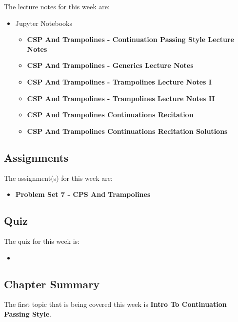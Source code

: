 \noindent The lecture notes for this week are:

\begin{itemize}
    \item Jupyter Notebooks
    \begin{itemize}
        \item \textbf{CSP And Trampolines - Continuation Passing Style Lecture Notes}
        \item \textbf{CSP And Trampolines - Generics Lecture Notes}
        \item \textbf{CSP And Trampolines - Trampolines Lecture Notes I}
        \item \textbf{CSP And Trampolines - Trampolines Lecture Notes II}
        \item \textbf{CSP And Trampolines Continuations Recitation}
        \item \textbf{CSP And Trampolines Continuations Recitation Solutions}
    \end{itemize}
\end{itemize}

\subsection{Assignments}

The assignment(s) for this week are:

\begin{itemize}
    \item \textbf{Problem Set 7 - CPS And Trampolines}
\end{itemize}

\subsection{Quiz}

The quiz for this week is:

\begin{itemize}
    \item {}
\end{itemize}

\subsection{Chapter Summary}

The first topic that is being covered this week is \textbf{Intro To Continuation Passing Style}.

